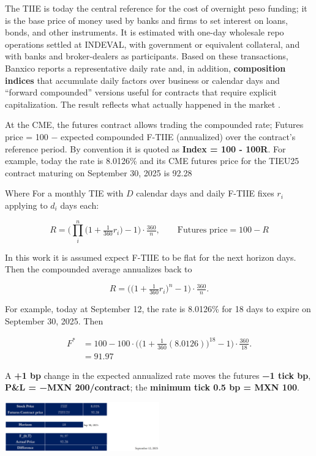 \documentclass[10pt,a4paper]{article} %
\begin{document}
The TIIE is today the central reference for the cost of overnight peso funding; it is the base price of money used by banks and firms to set interest on loans, bonds, and other instruments. It is estimated with one-day wholesale repo operations settled at INDEVAL, with government or equivalent collateral, and with banks and broker-dealers as participants. Based on these transactions, Banxico reports a representative daily rate and, in addition, \textbf{composition indices} that accumulate daily factors over business or calendar days and ``forward compounded'' versions useful for contracts that require explicit capitalization. The result reflects what actually happened in the market \citep{banxico_methodology,banxico_indices}.

At the CME, the futures contract allows trading the compounded rate; Futures price = 100 − expected compounded F-TIIE (annualized) over the contract’s reference period. By convention it is quoted as \textbf{Index = 100 - 100R}. For example, today the rate is 8.0126\% and its CME futures price for the TIEU25 contract maturing on September 30, 2025 is 92.28

Where For a monthly TIE with $D$ calendar days and daily F-TIIE fixes $r_i$ applying to $d_i$ days each:

  $$
  R=\Bigg(\prod_{i}^n\big(1+\tfrac{1}{360}r_i\big)-1\Bigg)\cdot \tfrac{360}{n},\qquad
  {\text{Futures price}=100-R}
  $$

In this work it is assumed expect F-TIIE to be flat for the next horizon days. Then the compounded average annualizes back to

$$
R=\Bigg(\big(1+\tfrac{1}{360}r_i\big)^n-1\Bigg)\cdot \tfrac{360}{n}.
$$

For example, today at September 12, the rate is 8.0126\% for 18 days to expire on September 30, 2025. Then  

\begin{align*}
  F^* &= 100 - 100\cdot \Bigg(\big(1+\tfrac{1}{360}(8.0126)\big)^{18}-1\Bigg)\cdot \tfrac{360}{18}. \\
  & = 91.97
\end{align*}


A \textbf{+1 bp} change in the expected annualized rate moves the futures \textbf{−1 tick bp}, \textbf{P\&L = −MXN 200/contract}; the \textbf{minimum tick 0.5 bp = MXN 100}.

\begin{center}
\includegraphics[width=0.5\textwidth]{figures/tiie_pricing_sep12.png}
\end{center}
\end{document}
